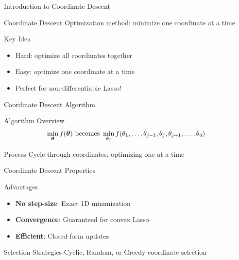 \documentclass{beamer}
\begin{document}
\begin{frame}{Introduction to Coordinate Descent}
\begin{definitionbox}{Coordinate Descent}
Optimization method: minimize one coordinate at a time
\end{definitionbox}
\pause

\begin{keypointsbox}{Key Idea}
{\footnotesize
\begin{itemize}
\item Hard: optimize all coordinates together
\item Easy: optimize one coordinate at a time
\item Perfect for non-differentiable Lasso!
\end{itemize}
}
\end{keypointsbox}
\end{frame}

\begin{frame}{Coordinate Descent Algorithm}
\begin{codebox}{Algorithm Overview}
$$\min_{\boldsymbol{\theta}} f(\boldsymbol{\theta}) \text{ becomes } \min_{\theta_j} f(\theta_1, \ldots, \theta_{j-1}, \theta_j, \theta_{j+1}, \ldots, \theta_d)$$
\end{codebox}

\begin{alertbox}{Process}
Cycle through coordinates, optimizing one at a time
\end{alertbox}
\end{frame}

%


\begin{frame}{Coordinate Descent Properties}
\begin{keypointsbox}{Advantages}
{\footnotesize
\begin{itemize}
\item \textbf{No step-size}: Exact 1D minimization
\item \textbf{Convergence}: Guaranteed for convex Lasso
\item \textbf{Efficient}: Closed-form updates
\end{itemize}
}
\end{keypointsbox}
\pause

\begin{codebox}{Selection Strategies}
{\footnotesize Cyclic, Random, or Greedy coordinate selection}
\end{codebox}
\end{frame}
\end{document}
